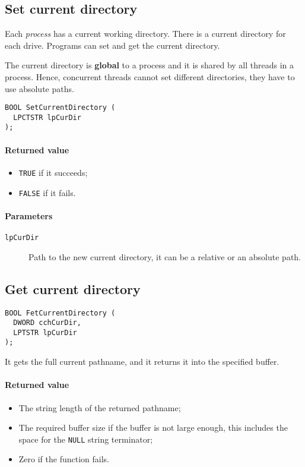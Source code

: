 \subsection{Set current directory}
Each \emph{process} has a current working directory. There is a current directory for each drive. Programs can set and get the current directory.

The current directory is \textbf{global} to a process and it is shared by all threads in a process. Hence, concurrent threads cannot set different directories, they have to use absolute paths.

\begin{verbatim}
BOOL SetCurrentDirectory (
  LPCTSTR lpCurDir
);
\end{verbatim}

\paragraph{Returned value}
\begin{itemize}
\item \texttt{TRUE} if it succeeds;
\item \texttt{FALSE} if it fails.
\end{itemize}

\paragraph{Parameters}
\begin{description}
\item [\texttt{lpCurDir}] Path to the new current directory, it can be a relative or an absolute path.
\end{description}

\subsection{Get current directory}
\begin{verbatim}
BOOL FetCurrentDirectory (
  DWORD cchCurDir,
  LPTSTR lpCurDir
);
\end{verbatim}

It gets the full current pathname, and it returns it into the specified buffer.

\paragraph{Returned value}
\begin{itemize}
\item The string length of the returned pathname;
\item The required buffer size if the buffer is not large enough, this includes the space for the \texttt{NULL} string terminator;
\item Zero if the function fails.
\end{itemize}

